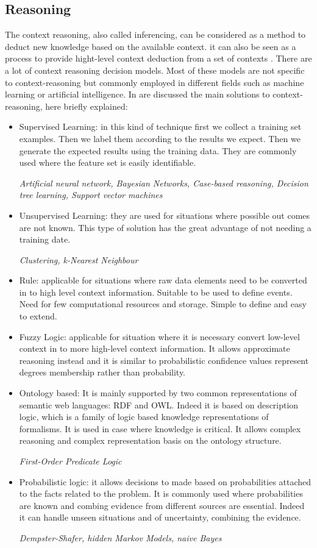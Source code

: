 \documentclass{thesisreport}
\begin{document}
 \subsection{Reasoning}
 The context reasoning, also called inferencing, can be considered as a method to deduct new knowledge based on the available context.  
 it can also be seen as a process to provide hight-level context deduction from a set of contexts \cite{perera2014context}.
 There are a lot of context reasoning decision models. Most of these models are not specific to context-reasoning but commonly employed in different fields such as machine learning or artificial intelligence.
 In \cite{perera2014context} are discussed the main solutions to context-reasoning, here briefly explained: 
 \begin{itemize}
     \item Supervised Learning: in this kind of technique first we collect a training set examples. Then we label them according to the results we expect. Then we generate the expected results using the training data.
     They are commonly used where the feature set is easily identifiable.
     
     \textit{Artificial neural network, Bayesian Networks, Case-based reasoning, Decision tree learning, Support vector machines}
     \item Unsupervised Learning: they are used for situations where possible out comes are not known. This type of solution has the great advantage of not needing a training date.
     
     \textit{Clustering, k-Nearest Neighbour}
     \item Rule: applicable for situations where raw data elements need to be converted in to high level context information. Suitable to be used to define events. Need for few computational resources and storage. Simple to define and easy to extend.
     \item Fuzzy Logic: applicable for situation where it is necessary convert low-level context in to more high-level context information. It allows approximate reasoning instead and it is similar to probabilistic confidence values represent degrees membership rather than probability.
     \item Ontology based: It is mainly supported by two common representations of semantic web languages: RDF and OWL. Indeed it is based on description logic, which is a family of logic based knowledge representations of formalisms. It is used in case where knowledge is critical. It allows complex reasoning and complex representation basis on the ontology structure.
    
     \textit{First-Order Predicate Logic}
     
     \item Probabilistic logic: it allows decisions to made based on probabilities attached to the facts related to the problem. It is commonly used where probabilities are known and combing evidence from different sources are essential. Indeed it can handle unseen situations and of uncertainty, combining the evidence.  
     
     \textit{Dempster-Shafer, hidden Markov Models, naive Bayes}
 \end{itemize}
\end{document}
